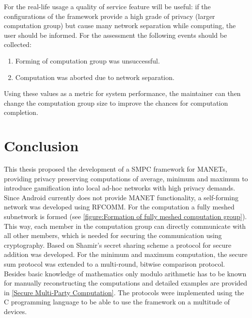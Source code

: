 For the real-life usage a quality of service feature will be useful: if the configurations of the framework provide a high grade of privacy (larger computation group) but cause many network separation while computing, the user should be informed. For the assessment the following events should be collected:
\begin{enumerate}
	\item Forming of computation group was unsuccessful.
	\item Computation was aborted due to network separation.
\end{enumerate}

Using these values as a metric for system performance, the maintainer can then change the computation group size to improve the chances for computation completion.


\FloatBarrier

\chapter{Conclusion} \label{Conclusion}


This thesis proposed the development of a \gls{SMPC} framework for \glspl{MANET}, providing privacy preserving computations of average, minimum and maximum to introduce gamification into local ad-hoc networks with high privacy demands.
Since Android currently does not provide \gls{MANET} functionality, a self-forming network was developed using \gls{RFCOMM}. For the computation a fully meshed subnetwork is formed (see \autoref{figure:Formation of fully meshed computation group}). This way, each member in the computation group can directly communicate with all other members, which is needed for securing the communication using cryptography.
Based on Shamir's secret sharing scheme a protocol for secure addition was developed. For the minimum and maximum computation, the secure sum protocol was extended to a multi-round, bitwise comparison protocol. Besides basic knowledge of mathematics only modulo arithmetic has to be known for manually reconstructing the computations and detailed examples are provided in \autoref{Secure Multi-Party Computation}. The protocols were implemented using the C programming language to be able to use the framework on a multitude of devices.


